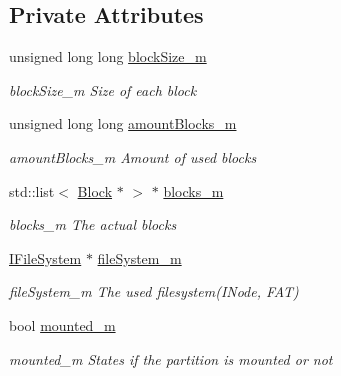 \subsection*{Private Attributes}
\begin{DoxyCompactItemize}
\item 
\mbox{\label{classlogic_1_1_partition_a9410761460a04e9958ca9e48290be880}} 
unsigned long long \mbox{\hyperlink{classlogic_1_1_partition_a9410761460a04e9958ca9e48290be880}{block\+Size\+\_\+m}}
\begin{DoxyCompactList}\small\item\em block\+Size\+\_\+m Size of each block \end{DoxyCompactList}\item 
\mbox{\label{classlogic_1_1_partition_aa85567a9950d6cb02b758929173a1894}} 
unsigned long long \mbox{\hyperlink{classlogic_1_1_partition_aa85567a9950d6cb02b758929173a1894}{amount\+Blocks\+\_\+m}}
\begin{DoxyCompactList}\small\item\em amount\+Blocks\+\_\+m Amount of used blocks \end{DoxyCompactList}\item 
\mbox{\label{classlogic_1_1_partition_a6490b6483eaf7a11e66deec3acb15ab5}} 
std\+::list$<$ \mbox{\hyperlink{classlogic_1_1_block}{Block}} $\ast$ $>$ $\ast$ \mbox{\hyperlink{classlogic_1_1_partition_a6490b6483eaf7a11e66deec3acb15ab5}{blocks\+\_\+m}}
\begin{DoxyCompactList}\small\item\em blocks\+\_\+m The actual blocks \end{DoxyCompactList}\item 
\mbox{\label{classlogic_1_1_partition_a44dab9460080410baf63cb8be0e13fcc}} 
\mbox{\hyperlink{class_i_file_system}{I\+File\+System}} $\ast$ \mbox{\hyperlink{classlogic_1_1_partition_a44dab9460080410baf63cb8be0e13fcc}{file\+System\+\_\+m}}
\begin{DoxyCompactList}\small\item\em file\+System\+\_\+m The used filesystem(\+I\+Node, F\+A\+T) \end{DoxyCompactList}\item 
\mbox{\label{classlogic_1_1_partition_afb41bc3b2c768ed25877dd6f6faa824d}} 
bool \mbox{\hyperlink{classlogic_1_1_partition_afb41bc3b2c768ed25877dd6f6faa824d}{mounted\+\_\+m}}
\begin{DoxyCompactList}\small\item\em mounted\+\_\+m States if the partition is mounted or not \end{DoxyCompactList}\end{DoxyCompactItemize}
